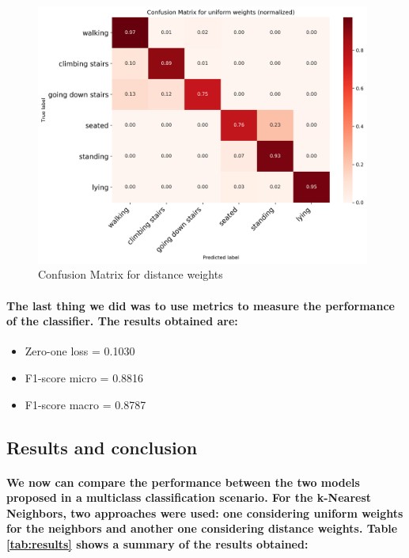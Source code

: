 \documentclass[a4paper]{article}    %
\begin{document}
\begin{figure}[H]
    \centering
    \includegraphics[width=11cm]{cm_distance_normalized}
    \caption{Confusion Matrix for distance weights}
    \label{fig:ex2-b-cm_distance_normalized}
\end{figure}

\paragraph{The last thing we did was to use metrics to measure the performance of the classifier. The results obtained are:}

\begin{itemize}
    \item Zero-one loss = 0.1030
    \item F1-score micro = 0.8816
    \item F1-score macro = 0.8787
\end{itemize}

\subsection{Results and conclusion}

\paragraph{We now can compare the performance between the two models proposed in a multiclass classification scenario. For the k-Nearest Neighbors, two approaches were used: one considering uniform weights for the neighbors and another one considering distance weights. Table \ref{tab:results} shows a summary of the results obtained:}
\end{document}
